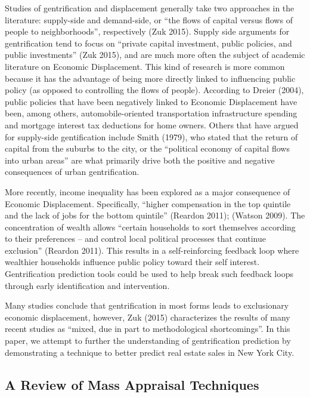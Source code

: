 \documentclass[12pt,]{article}
\begin{document}
Studies of gentrification and displacement generally take two approaches
in the literature: supply-side and demand-side, or ``the flows of
capital versus flows of people to neighborhoods'', respectively (Zuk
2015). Supply side arguments for gentrification tend to focus on
``private capital investment, public policies, and public investments''
(Zuk 2015), and are much more often the subject of academic literature
on Economic Displacement. This kind of research is more common because
it has the advantage of being more directly linked to influencing public
policy (as opposed to controlling the flows of people). According to
Dreier (2004), public policies that have been negatively linked to
Economic Displacement have been, among others, automobile-oriented
transportation infrastructure spending and mortgage interest tax
deductions for home owners. Others that have argued for supply-side
gentification include Smith (1979), who stated that the return of
capital from the suburbs to the city, or the ``political economy of
capital flows into urban areas'' are what primarily drive both the
positive and negative consequences of urban gentrification.

More recently, income inequality has been explored as a major
consequence of Economic Displacement. Specifically, ``higher
compensation in the top quintile and the lack of jobs for the bottom
quintile'' (Reardon 2011); (Watson 2009). The concentration of wealth
allows ``certain households to sort themselves according to their
preferences -- and control local political processes that continue
exclusion'' (Reardon 2011). This results in a self-reinforcing feedback
loop where wealthier households influence public policy toward their
self interest. Gentrification prediction tools could be used to help
break such feedback loops through early identification and intervention.

Many studies conclude that gentrification in most forms leads to
exclusionary economic displacement, however, Zuk (2015) characterizes
the results of many recent studies as ``mixed, due in part to
methodological shortcomings''. In this paper, we attempt to further the
understanding of gentrification prediction by demonstrating a technique
to better predict real estate sales in New York City.

\hypertarget{a-review-of-mass-appraisal-techniques}{%
\subsection{A Review of Mass Appraisal
Techniques}\label{a-review-of-mass-appraisal-techniques}}
\end{document}
